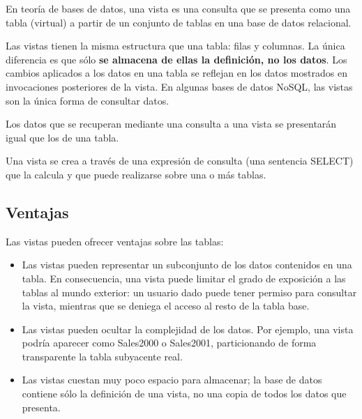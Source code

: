 \documentclass[12pt, fleqn]{report}                             %
\begin{document}
        En teoría de bases de datos, una vista es una consulta que se presenta como una tabla (virtual)
        a partir de un conjunto de tablas en una base de datos relacional.

        Las vistas tienen la misma estructura que una tabla: filas y columnas.
        La única diferencia es que sólo \textbf{se almacena de ellas la definición, no los datos}.
        Los cambios aplicados a los datos en una tabla se reflejan en los datos mostrados en invocaciones
        posteriores de la vista.
        En algunas bases de datos NoSQL, las vistas son la única forma de consultar datos.

        Los datos que se recuperan mediante una consulta a una vista se presentarán igual que los de una tabla.

        Una vista se crea a través de una expresión de consulta (una sentencia SELECT) que la calcula y que puede
        realizarse sobre una o más tablas.


        \subsection{Ventajas}

            Las vistas pueden ofrecer ventajas sobre las tablas:

            \begin{itemize}

                \item
                    Las vistas pueden representar un subconjunto de los datos contenidos en una tabla.
                    En consecuencia, una vista puede limitar el grado de exposición a las tablas al mundo exterior:
                    un usuario dado puede tener permiso para consultar la vista, mientras que se deniega el acceso
                    al resto de la tabla base.

                \item
                    Las vistas pueden ocultar la complejidad de los datos.
                    Por ejemplo, una vista podría aparecer como Sales2000 o Sales2001, particionando
                    de forma transparente la tabla subyacente real.

                \item 
                    Las vistas cuestan muy poco espacio para almacenar; la base de datos contiene sólo
                    la definición de una vista, no una copia de todos los datos que presenta.

            \end{itemize}
\end{document}
